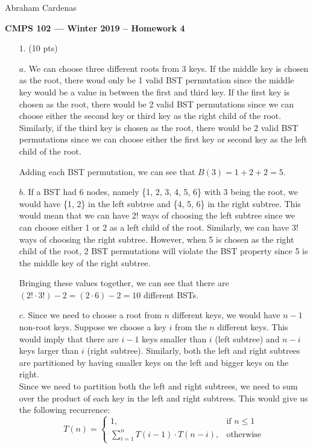 \documentclass[11pt]{article}
\begin{document}
\hfill Abraham Cardenas


\begin{center}
{\bf\Large CMPS 102 --- Winter 2019 --  Homework 4}
\end{center}

\begin{itemize}

\item[$1.$] (10 pts)
\item[$a.$] 
We can choose three different roots from 3 keys. If the middle key is chosen as the root, there woud only be 1 valid BST permutation since the middle key would be a value in between the first and third key. If the first key is chosen as the root, there would be 2 valid BST permutations since we can choose either the second key or third key as the right child of the root. Similarly, if the third key is chosen as the root, there would be 2 valid BST permutations since we can choose either the first key or second key as the left child of the root. 

Adding each BST permutation, we can see that $B(3) = 1 + 2 + 2 = 5$.

\item[$b.$]
If a BST had 6 nodes, namely \{1, 2, 3, 4, 5, 6\} with 3 being the root, we would have \{1, 2\} in the left subtree and \{4, 5, 6\} in the right subtree. This would mean that we can have $2!$ ways of choosing the left subtree since we can choose either 1 or 2 as a left child of the root. Similarly, we can have $3!$ ways of choosing the right subtree. However, when 5 is chosen as the right child of the root, 2 BST permutations will violate the BST property since 5 is the middle key of the right subtree.

Bringing these values together, we can see that there are $(2! \cdot 3!) - 2= (2 \cdot 6) - 2 = 10$ different BSTs. 

\item[$c.$]
Since we need to choose a root from $n$ different keys, we would have $n-1$ non-root keys. Suppose we choose a key $i$ from the $n$ different keys. This would imply that there are $i-1$ keys smaller than $i$ (left subtree) and $n-i$ keys larger than $i$ (right subtree). Similarly, both the left and right subtrees are partitioned by having smaller keys on the left and bigger keys on the right.\\

Since we need to partition both the left and right subtrees, we need to sum over the product of each key in the left and right subtrees. This would give us the following recurrence: 
$$\boxed{{\displaystyle T(n)={
\begin{cases}{1},&{\text{if }} n \leq 1\\ \sum_{i=1}^{n} T(i-1) \cdot T(n-i),&{\text{otherwise}}
\end{cases}}}}$$


\end{itemize}
\end{document}
